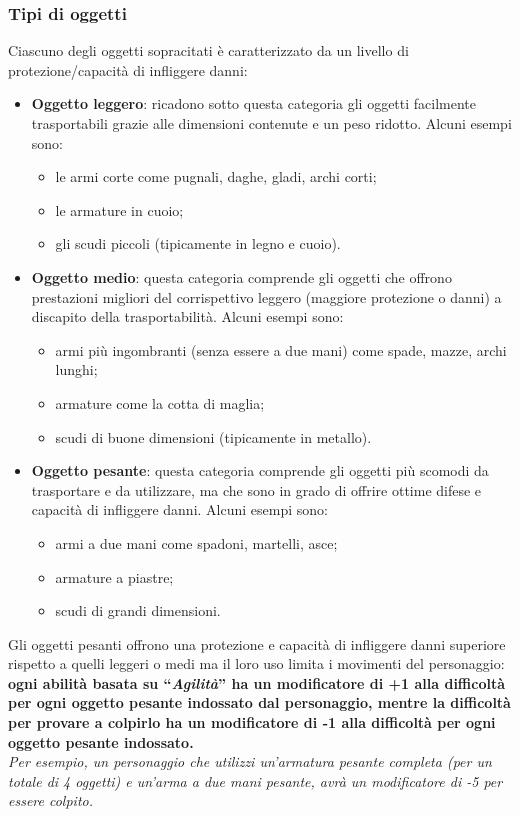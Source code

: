 \documentclass[../manuale_main.tex]{subfiles}
\begin{document}
\subsubsection{Tipi di oggetti}
Ciascuno degli oggetti sopracitati è caratterizzato da un livello di protezione/capacità di infliggere danni:
\begin{itemize}
\item \textbf{Oggetto leggero}: ricadono sotto questa categoria gli oggetti facilmente trasportabili grazie alle dimensioni contenute e un peso ridotto. Alcuni esempi sono:
\begin{itemize}
\item le armi corte come pugnali, daghe, gladi, archi corti;
\item le armature in cuoio;
\item gli scudi piccoli (tipicamente in legno e cuoio).
\end{itemize}
\item \textbf{Oggetto medio}: questa categoria comprende gli oggetti che offrono prestazioni migliori del corrispettivo leggero (maggiore protezione o danni) a discapito della trasportabilità. Alcuni esempi sono:
\begin{itemize}
\item armi più ingombranti (senza essere a due mani) come spade, mazze, archi lunghi;
\item armature come la cotta di maglia;
\item scudi di buone dimensioni (tipicamente in metallo).
\end{itemize}
\item \textbf{Oggetto pesante}: questa categoria comprende gli oggetti più scomodi da trasportare e da utilizzare, ma che sono in grado di offrire ottime difese e capacità di infliggere danni. Alcuni esempi sono:
\begin{itemize}
\item armi a due mani come spadoni, martelli, asce;
\item armature a piastre;
\item scudi di grandi dimensioni.
\end{itemize}
\end{itemize}

Gli oggetti pesanti offrono una protezione e capacità di infliggere danni superiore rispetto a quelli leggeri o medi ma il loro uso limita i movimenti del personaggio:\\
\textbf{ogni abilità basata su ``\emph{Agilità}'' ha un modificatore di +1 alla difficoltà per ogni oggetto pesante indossato dal personaggio, mentre la difficoltà per provare a colpirlo ha un modificatore di -1 alla difficoltà per ogni oggetto pesante indossato.}\\
\textit{Per esempio, un personaggio che utilizzi un'armatura pesante completa (per un totale di 4 oggetti) e un'arma a due mani pesante, avrà un modificatore di -5 per essere colpito.}
\end{document}
